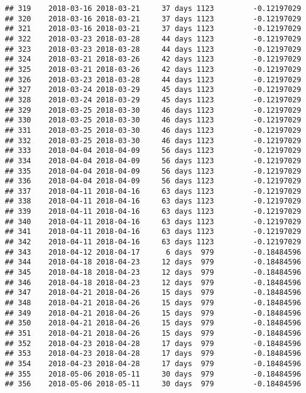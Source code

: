 \documentclass[]{article}
\begin{document}
\begin{verbatim}
## 319    2018-03-16 2018-03-21     37 days 1123         -0.12197029
## 320    2018-03-16 2018-03-21     37 days 1123         -0.12197029
## 321    2018-03-16 2018-03-21     37 days 1123         -0.12197029
## 322    2018-03-23 2018-03-28     44 days 1123         -0.12197029
## 323    2018-03-23 2018-03-28     44 days 1123         -0.12197029
## 324    2018-03-21 2018-03-26     42 days 1123         -0.12197029
## 325    2018-03-21 2018-03-26     42 days 1123         -0.12197029
## 326    2018-03-23 2018-03-28     44 days 1123         -0.12197029
## 327    2018-03-24 2018-03-29     45 days 1123         -0.12197029
## 328    2018-03-24 2018-03-29     45 days 1123         -0.12197029
## 329    2018-03-25 2018-03-30     46 days 1123         -0.12197029
## 330    2018-03-25 2018-03-30     46 days 1123         -0.12197029
## 331    2018-03-25 2018-03-30     46 days 1123         -0.12197029
## 332    2018-03-25 2018-03-30     46 days 1123         -0.12197029
## 333    2018-04-04 2018-04-09     56 days 1123         -0.12197029
## 334    2018-04-04 2018-04-09     56 days 1123         -0.12197029
## 335    2018-04-04 2018-04-09     56 days 1123         -0.12197029
## 336    2018-04-04 2018-04-09     56 days 1123         -0.12197029
## 337    2018-04-11 2018-04-16     63 days 1123         -0.12197029
## 338    2018-04-11 2018-04-16     63 days 1123         -0.12197029
## 339    2018-04-11 2018-04-16     63 days 1123         -0.12197029
## 340    2018-04-11 2018-04-16     63 days 1123         -0.12197029
## 341    2018-04-11 2018-04-16     63 days 1123         -0.12197029
## 342    2018-04-11 2018-04-16     63 days 1123         -0.12197029
## 343    2018-04-12 2018-04-17      6 days  979         -0.18484596
## 344    2018-04-18 2018-04-23     12 days  979         -0.18484596
## 345    2018-04-18 2018-04-23     12 days  979         -0.18484596
## 346    2018-04-18 2018-04-23     12 days  979         -0.18484596
## 347    2018-04-21 2018-04-26     15 days  979         -0.18484596
## 348    2018-04-21 2018-04-26     15 days  979         -0.18484596
## 349    2018-04-21 2018-04-26     15 days  979         -0.18484596
## 350    2018-04-21 2018-04-26     15 days  979         -0.18484596
## 351    2018-04-21 2018-04-26     15 days  979         -0.18484596
## 352    2018-04-23 2018-04-28     17 days  979         -0.18484596
## 353    2018-04-23 2018-04-28     17 days  979         -0.18484596
## 354    2018-04-23 2018-04-28     17 days  979         -0.18484596
## 355    2018-05-06 2018-05-11     30 days  979         -0.18484596
## 356    2018-05-06 2018-05-11     30 days  979         -0.18484596

\end{verbatim}
\end{document}
